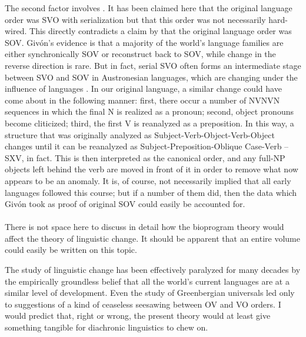 The second factor involves . It has been claimed here that the original language order was SVO with serialization but that this order was not necessarily hard-wired. This directly contradicts a claim by \citet[Chapter~7]{Givón1979} that the original language order was SOV. Givón's evidence is that a majority of the world's language families are either synchronically SOV or reconstruct back to SOV, while change in the reverse direction is rare. But in fact, serial SVO often forms an intermediate stage between SVO and SOV in Austro\-nesian languages, which are changing under the influence of  languages \citep{Bradshaw1979}. In our original language, a similar change could have come about in the following manner: first, there occur a number of NVNVN sequences in which the final N is realized as a pronoun; second, object pronouns become cliticized; third, the first V is reanalyzed as a preposition. In this way, a structure that was originally analyzed as Subject-Verb-Object-Verb-Object changes until it can be reanalyzed as Subject-Preposition-Oblique Case-Verb -- SXV, in fact. This is then interpreted as the canonical order, and any full-NP objects left behind the verb are moved in front of it in order to remove what now appears to be an anomaly. It is, of course, not necessarily implied that all early languages followed this course; but if a number of them did, then the data which Givón took as proof of original SOV could easily be accounted for.\\\\

There is not space here to discuss in detail how the bioprogram theory would affect the theory of linguistic change. It should be apparent that an entire volume could easily be written on this topic.

The study of linguistic change has been effectively paralyzed for many decades by the empirically groundless belief that all the world's current languages are at a similar level of development. Even the study of Greenbergian universals led only to suggestions of a kind of ceaseless seesawing between OV and VO orders. I would predict that, right or wrong, the present theory would at least give something tangible for diachronic linguistics to chew on.

